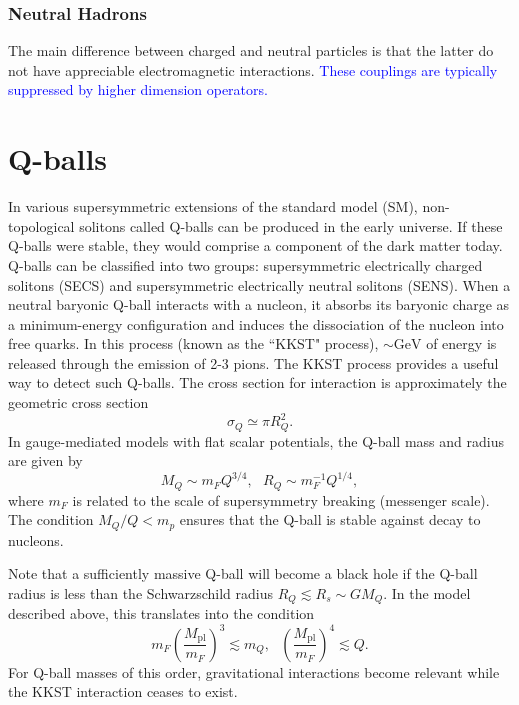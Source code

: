 \documentclass[twocolumn,showpacs,preprintnumbers,amsmath,amssymb,prl]{revtex4}
\newcommand{\Mpl}{M_{\text{pl}}}
\def\r{\right)}
\def\l{\left(}
\begin{document}
\subsubsection{Neutral Hadrons}
The main difference between charged and neutral particles is that the latter do not have appreciable electromagnetic interactions. \textcolor{blue}{These couplings are typically suppressed by higher dimension operators.} 

\section{Q-balls}
In various supersymmetric extensions of the standard model (SM), non-topological solitons called Q-balls can be produced in the early universe. If these Q-balls were stable, they would comprise a component of the dark matter today. Q-balls can be classified into two groups: supersymmetric electrically charged solitons (SECS) and supersymmetric electrically neutral solitons (SENS). When a neutral baryonic Q-ball interacts with a nucleon, it absorbs its baryonic charge as a minimum-energy configuration and induces the dissociation of the nucleon into free quarks. In this process (known as the ``KKST" process), $\sim \text{GeV}$ of energy is released through the emission of 2-3 pions. The KKST process provides a useful way to detect such Q-balls. The cross section for interaction is approximately the geometric cross section
\begin{equation}
\sigma_Q \simeq \pi R_Q^2.
\end{equation}
In gauge-mediated models with flat scalar potentials, the Q-ball mass and radius are given by
\begin{equation}
M_Q \sim m_F Q^{3/4}, ~~~ R_Q \sim m_F^{-1} Q^{1/4},
\end{equation}
where $m_F$ is related to the scale of supersymmetry breaking (messenger scale). The condition $M_Q/Q < m_p$ ensures that the Q-ball is stable against decay to nucleons. 

Note that a sufficiently massive Q-ball will become a black hole if the Q-ball radius is less than the Schwarzschild radius $R_Q \lesssim R_s \sim G M_Q$. In the model described above, this translates into the condition
\begin{equation}
m_F \l\frac{\Mpl}{m_F}\r^3 \lesssim m_Q, ~~~ \l\frac{\Mpl}{m_F}\r^4 \lesssim Q.
\end{equation}
For Q-ball masses of this order, gravitational interactions become relevant while the KKST interaction ceases to exist. 
\end{document}
